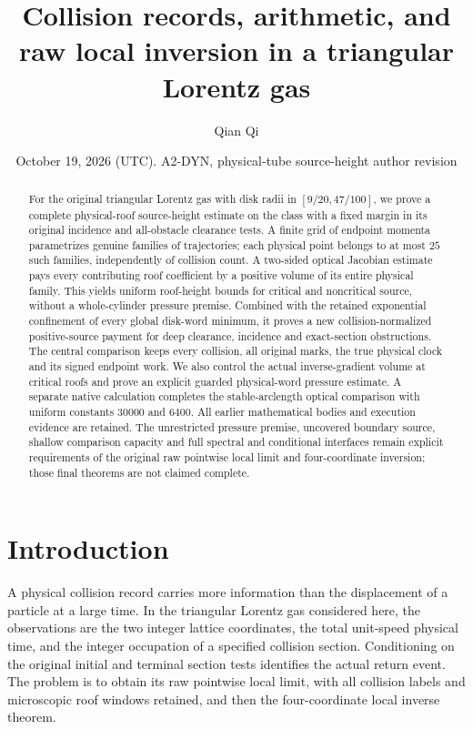 \documentclass[11pt,reqno]{amsart}
\title[Collision records and raw local inversion]{Collision records, arithmetic, and raw local inversion in a triangular Lorentz gas}
\author{Qian Qi}
\date{October 19, 2026 (UTC). A2-DYN, physical-tube source-height author revision}
\numberwithin{equation}{section}
\theoremstyle{definition}\newtheorem{definition}[theorem]{Definition}
\theoremstyle{remark}\newtheorem{remark}[theorem]{Remark}
\begin{document}
\raggedbottom
\begin{abstract}
For the original triangular Lorentz gas with disk radii in
$[9/20,47/100]$, we prove a complete physical-roof source-height
estimate on the class with a fixed margin in its original incidence
and all-obstacle clearance tests. A finite grid of endpoint momenta
parametrizes genuine families of trajectories; each physical point
belongs to at most $25$ such families, independently of collision
count. A two-sided optical Jacobian estimate pays every contributing
roof coefficient by a positive volume of its entire physical family.
This yields uniform roof-height bounds for critical and noncritical
source, without a whole-cylinder pressure premise. Combined with
the retained exponential confinement of every global disk-word
minimum, it proves a new collision-normalized positive-source
payment for deep clearance, incidence and exact-section obstructions.
The central comparison keeps every collision, all original marks,
the true physical clock and its signed endpoint work. We also
control the actual inverse-gradient volume at critical roofs and
prove an explicit guarded physical-word pressure estimate.
A separate native calculation completes the stable-arclength
optical comparison with uniform constants $30000$ and $6400$.
All earlier mathematical bodies and execution evidence are retained.
The unrestricted pressure premise, uncovered boundary source,
shallow comparison capacity and full spectral and conditional
interfaces remain explicit requirements of the original raw
pointwise local limit and four-coordinate inversion; those final
theorems are not claimed complete.
\end{abstract}
\maketitle
\enlargethispage{3pt}

\section*{Introduction}
A physical collision record carries more information than the
displacement of a particle at a large time.  In the triangular
Lorentz gas considered here, the observations are the two integer
lattice coordinates, the total unit-speed physical time, and the
integer occupation of a specified collision section.  Conditioning
on the original initial and terminal section tests identifies the
actual return event.  The problem is to obtain its raw pointwise
local limit, with all collision labels and microscopic roof windows
retained, and then the four-coordinate local inverse theorem.
\end{document}
